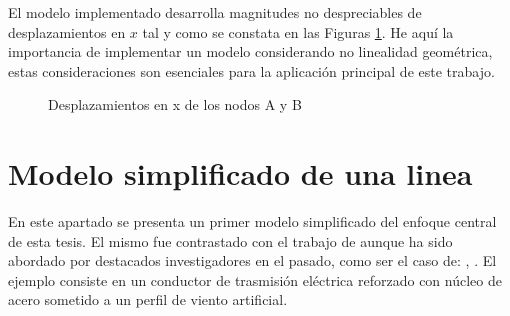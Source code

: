 
El modelo implementado desarrolla magnitudes no despreciables de desplazamientos en $x$ tal y como se constata en las Figuras \ref{fig:RN:RA:DispsXAB}. He aquí  la importancia de implementar un modelo considerando no linealidad geométrica, estas consideraciones son esenciales para la aplicación principal de este trabajo.  


\begingroup
\centering
\begin{figure}[htbp]
	\centering
	\label{fig:RN:RA:DispxB}
	\label{fig:RN:RA:DispxA}
	\caption{Desplazamientos en x de los nodos A y B} \label{fig:RN:RA:DispsXAB}
\end{figure}
\endgroup

\section{Modelo simplificado de una linea}\label{Sec:RN:FotiCable}
En este apartado se presenta un primer modelo simplificado del enfoque central de esta tesis. El mismo fue contrastado con el trabajo de \cite{foti2018finite} aunque ha sido abordado por destacados investigadores en el pasado, como ser el caso de: \cite{luongo1998non}, \cite{martinelli2001numerical}. El ejemplo consiste en un conductor de trasmisión eléctrica reforzado con núcleo de acero sometido a un perfil de viento artificial. 

